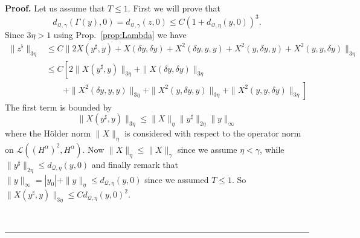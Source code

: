 \documentclass[a4paper,12pt,reqno]{article}
\newcommand{\der}{\delta}
\newcommand{\QQ}{\mathcal{Q}}
\newcommand{\LL}{\mathcal{L}}
\newenvironment{proof}[1][Proof]{\textbf{#1.} }{\ \rule{0.5em}{0.5em}}
\begin{document}
\begin{proof}
Let us assume that $T \le 1$.
First we will prove that
\begin{equation}
  \label{eq:bound-on-Gamma}
  d_{\QQ,\gamma}(\Gamma(y),0) = d_{\QQ,\gamma}(z,0) \le C (1+d_{\QQ,\eta}(y,0))^3.
\end{equation}
Since $3\eta > 1$ using Prop.~\ref{prop:Lambda} we have
\begin{equation}
\label{eq:flat-bound}
  \begin{split}
\|z^{\flat}\|_{3\eta} & \le C \|2 X(y^\sharp,y) 
+ X(\der y,\der y) 
 + X^2(\der y,y,y) +
X^2(y,\der y,y) + X^2( y,y,\der y) \|_{3\eta}
\\ & \le C \left[ 2\| X(y^\sharp,y) \|_{3\eta}
+ \|X(\der y,\der y)\|_{3\eta} 
\right. \\ & \qquad \left. + \|X^2(\der y,y,y)\|_{3\eta} +
\|X^2(y,\der y,y)\|_{3\eta} + \|X^2( y,y,\der y) \|_{3\eta}\right]
  \end{split}
\end{equation}
The first term is bounded by
$$
\| X(y^\sharp,y) \|_{3\eta} \le \|X\|_{\eta} \|y^\sharp\|_{2\eta} \|y\|_{\infty}
$$
where the H\"older norm $\|X\|_{\eta}$ is considered with respect to
the operator norm on $\LL((H^\alpha)^2,H^\alpha)$. Now
$\|X\|_\eta \le \|X\|_\gamma$ since we assume $\eta < \gamma$, while
$\|y^\sharp\|_{2\eta} \le d_{\QQ,\eta}(y,0)$ and finally 
remark that $\|y\|_{\infty} = |y_0|+ \|y\|_{\eta} \le
d_{\QQ,\eta}(y,0)$ since we assumed $T \le 1$. So  
$
\| X(y^\sharp,y) \|_{3\eta} \le C d_{\QQ,\eta}(y,0)^2
$.


\end{proof}
\end{document}
